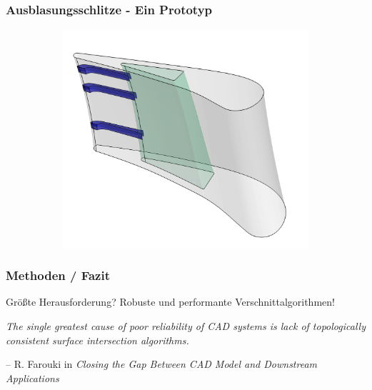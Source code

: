 \documentclass[8pt, aspectratio=169]{beamer}
\begin{document}
\begin{frame}
	\frametitle{Ausblasungsschlitze - Ein Prototyp}
	\vspace{-1cm}\hspace{2.5cm}
	\begin{figure}
		\centering
		\begin{subfigure}{.55\textwidth}
			\includegraphics[width=\textwidth]{../tec/slots/oha_trimmed.png}
		\end{subfigure}
	\end{figure}
\end{frame}

\begin{frame}
	\frametitle{Methoden / Fazit}
	\vspace{-1cm}\hspace{-0.5cm}
	\begin{minipage}[t]{\textwidth}
		\begin{center}
		Größte Herausforderung? Robuste und performante Verschnittalgorithmen!
		\end{center}
		\vspace{0.5cm}
		\begin{center}
		\emph{\glqq The single greatest cause of poor reliability of CAD systems is lack of topologically consistent surface intersection algorithms.\grqq}
		\end{center}
		\vspace{0.5cm}
		\flushright -- R. Farouki in \emph{\glqq Closing the Gap Between CAD Model and Downstream Applications\grqq}
	\end{minipage}
\end{frame}
\end{document}
